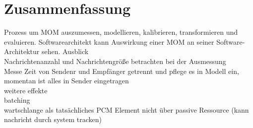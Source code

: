 
\chapter{Zusammenfassung}
\label{ch:zusammenfassung}


Prozess um MOM auszumessen, modellieren, kalibrieren, transformieren und evaluieren.
Softwarearchitekt kann Auswirkung einer MOM an seiner Software-Architektur sehen. 
Ausblick\\
Nachrichtenanzahl und Nachrichtengröße betrachten bei der Ausmessung \\
Messe Zeit von Sendenr und Empfänger getrennt und pflege es in Modell ein, momentan ist alles in Sender eingetragen \\
weitere effekte \\
batching \\
wartschlange als tatsächliches PCM Element nicht über passive Ressource (kann nachricht durch system tracken)
